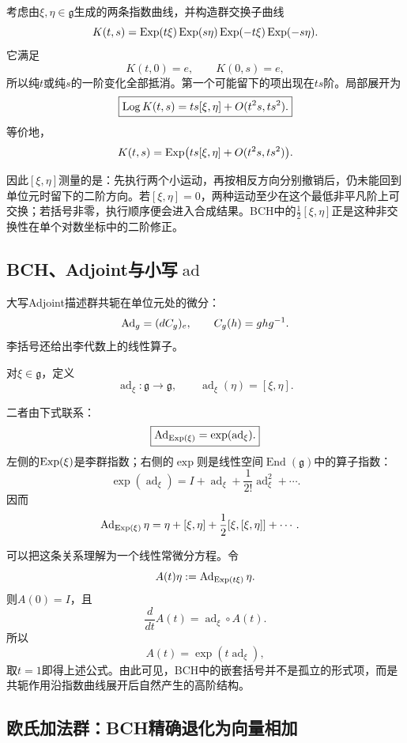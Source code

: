 考虑由$\xi,\eta\in\mathfrak g$生成的两条指数曲线，并构造群交换子曲线
\[
    K(t,s)
    =\operatorname{Exp}(t\xi)\operatorname{Exp}(s\eta)
    \operatorname{Exp}(-t\xi)\operatorname{Exp}(-s\eta).
\]
它满足
\[
    K(t,0)=e,
    \qquad
    K(0,s)=e,
\]
所以纯$t$或纯$s$的一阶变化全部抵消。第一个可能留下的项出现在$ts$阶。局部展开为
\[
    \boxed{
    \operatorname{Log} K(t,s)
    =ts[\xi,\eta]
    +O(t^2s,ts^2).
    }
\]
等价地，
\[
    K(t,s)
    =\operatorname{Exp}\bigl(ts[\xi,\eta]
    +O(t^2s,ts^2)\bigr).
\]

因此$[\xi,\eta]$测量的是：先执行两个小运动，再按相反方向分别撤销后，仍未能回到单位元时留下的二阶方向。若$[\xi,\eta]=0$，两种运动至少在这个最低非平凡阶上可交换；若括号非零，执行顺序便会进入合成结果。BCH中的$\frac12[\xi,\eta]$正是这种非交换性在单个对数坐标中的二阶修正。

\subsection{BCH、Adjoint与小写$\operatorname{ad}$}

大写Adjoint描述群共轭在单位元处的微分：
\[
    \operatorname{Ad}_g=(dC_g)_e,
    \qquad
    C_g(h)=ghg^{-1}.
\]
李括号还给出李代数上的线性算子。

\begin{definition}[李代数的adjoint算子]
对$\xi\in\mathfrak g$，定义
\[
    \operatorname{ad}_\xi:\mathfrak g\to\mathfrak g,
    \qquad
    \operatorname{ad}_\xi(\eta)=[\xi,\eta].
\]
\end{definition}

二者由下式联系：
\[
    \boxed{
    \operatorname{Ad}_{\operatorname{Exp}(\xi)}
    =\exp(\operatorname{ad}_\xi).
    }
\]
左侧的$\operatorname{Exp}(\xi)$是李群指数；右侧的$\exp$则是线性空间$\operatorname{End}(\mathfrak g)$中的算子指数：
\[
    \exp(\operatorname{ad}_\xi)
    =I+\operatorname{ad}_\xi
    +\frac1{2!}\operatorname{ad}_\xi^2+\cdots.
\]
因而
\[
\begin{aligned}
    \operatorname{Ad}_{\operatorname{Exp}(\xi)}\eta
    ={}&\eta+[\xi,\eta]
    +\frac12[\xi,[\xi,\eta]]+\cdots.
\end{aligned}
\]

可以把这条关系理解为一个线性常微分方程。令
\[
    A(t)\eta:=\operatorname{Ad}_{\operatorname{Exp}(t\xi)}\eta.
\]
则$A(0)=I$，且
\[
    \frac{d}{dt}A(t)
    =\operatorname{ad}_\xi\circ A(t).
\]
所以
\[
    A(t)=\exp(t\operatorname{ad}_\xi),
\]
取$t=1$即得上述公式。由此可见，BCH中的嵌套括号并不是孤立的形式项，而是共轭作用沿指数曲线展开后自然产生的高阶结构。

\subsection{欧氏加法群：BCH精确退化为向量相加}

